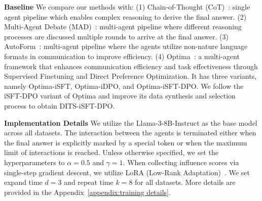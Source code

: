 

\textbf{Baseline} We compare our methods with: (1) Chain-of-Thought (CoT)~\cite{DBLP:conf/nips/Wei0SBIXCLZ22}: single agent pipeline which enables complex reasoning to derive the final answer. %
(2) Multi-Agent Debate (MAD)~\cite{DBLP:conf/icml/Du00TM24}: multi-agent pipeline where different reasoning processes are discussed multiple rounds to arrive at the final answer. (3) AutoForm~\cite{DBLP:conf/emnlp/ChenYYSQYXL024}: multi-agent pipeline where the agents utilize non-nature language formats in communication to improve efficiency. (4) Optima~\cite{DBLP:journals/corr/abs-2410-08115}: a multi-agent framework that enhances communication efficiency and task effectiveness through Supervised Finetuning and Direct Preference Optimization. It has three variants, namely Optima-iSFT, Optima-iDPO, and Optima-iSFT-DPO. We follow the iSFT-DPO variant of Optima and improve its data synthesis and selection process to obtain DITS-iSFT-DPO.


\textbf{Implementation Details} We utilize the Llama-3-8B-Instruct as the base model across all datasets. The interaction between the agents is terminated either when the final answer is explicitly marked by a special token or when the maximum limit of interactions is reached. 
Unless otherwise specified, we set the hyperparameters to $\alpha=0.5$ and $\gamma=1$. When collecting influence scores via single-step gradient descent, we utilize LoRA (Low-Rank Adaptation)~\cite{DBLP:conf/iclr/HuSWALWWC22}. We set expand time $d=3$ and repeat time $k=8$ for all datasets. More details are provided in the Appendix~\ref{appendix:training details}. 
